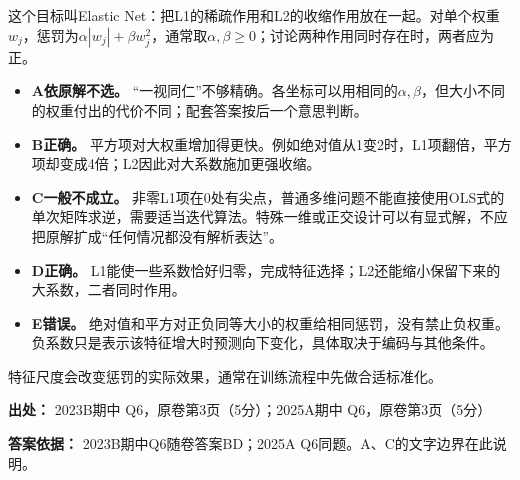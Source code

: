 这个目标叫Elastic Net：把L1的稀疏作用和L2的收缩作用放在一起。对单个权重\(w_j\)，惩罚为\(\alpha|w_j|+\beta w_j^2\)，通常取\(\alpha,\beta\ge0\)；讨论两种作用同时存在时，两者应为正。



\begin{itemize}

\item \textbf{A依原解不选。} “一视同仁”不够精确。各坐标可以用相同的\(\alpha,\beta\)，但大小不同的权重付出的代价不同；配套答案按后一个意思判断。

\item \textbf{B正确。} 平方项对大权重增加得更快。例如绝对值从1变2时，L1项翻倍，平方项却变成4倍；L2因此对大系数施加更强收缩。

\item \textbf{C一般不成立。} 非零L1项在0处有尖点，普通多维问题不能直接使用OLS式的单次矩阵求逆，需要适当迭代算法。特殊一维或正交设计可以有显式解，不应把原解扩成“任何情况都没有解析表达”。

\item \textbf{D正确。} L1能使一些系数恰好归零，完成特征选择；L2还能缩小保留下来的大系数，二者同时作用。

\item \textbf{E错误。} 绝对值和平方对正负同等大小的权重给相同惩罚，没有禁止负权重。负系数只是表示该特征增大时预测向下变化，具体取决于编码与其他条件。

\end{itemize}


特征尺度会改变惩罚的实际效果，通常在训练流程中先做合适标准化。


\textbf{出处：} 2023B期中 Q6，原卷第3页（5分）；2025A期中 Q6，原卷第3页（5分）


\textbf{答案依据：} 2023B期中Q6随卷答案BD；2025A Q6同题。A、C的文字边界在此说明。
